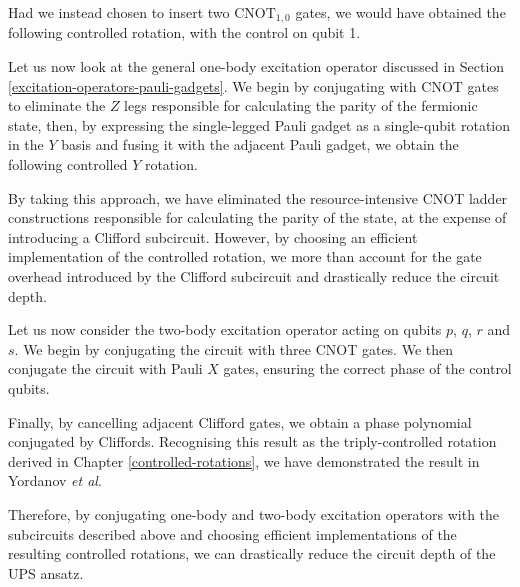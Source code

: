 
Had we instead chosen to insert two $\text{CNOT}_{1, 0}$ gates, we would have obtained the following controlled rotation, with the control on qubit 1.


Let us now look at the general one-body excitation operator discussed in Section \ref{excitation-operators-pauli-gadgets}. We begin by conjugating with CNOT gates to eliminate the $Z$ legs responsible for calculating the parity of the fermionic state, then, by expressing the single-legged Pauli gadget as a single-qubit rotation in the $Y$ basis and fusing it with the adjacent Pauli gadget, we obtain the following controlled $Y$ rotation.


By taking this approach, we have eliminated the resource-intensive CNOT ladder constructions responsible for calculating the parity of the state, at the expense of introducing a Clifford subcircuit. However, by choosing an efficient implementation of the controlled rotation, we more than account for the gate overhead introduced by the Clifford subcircuit and drastically reduce the circuit depth.

Let us now consider the two-body excitation operator acting on qubits $p$, $q$, $r$ and $s$. We begin by conjugating the circuit with three CNOT gates. We then conjugate the circuit with Pauli $X$ gates, ensuring the correct phase of the control qubits.


Finally, by cancelling adjacent Clifford gates, we obtain a phase polynomial conjugated by Cliffords. Recognising this result as the triply-controlled rotation derived in Chapter \ref{controlled-rotations}, we have demonstrated the result in Yordanov \textit{et al}.


Therefore, by conjugating one-body and two-body excitation operators with the subcircuits described above and choosing efficient implementations of the resulting controlled rotations, we can drastically reduce the circuit depth of the UPS ansatz.
